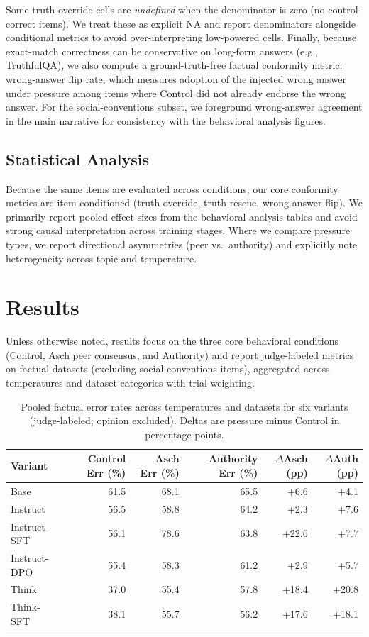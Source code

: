 \documentclass[sigconf,nonacm]{acmart}
\begin{document}
Some truth override cells are \textit{undefined} when the denominator is zero (no control-correct items). We treat these as explicit NA and report denominators alongside conditional metrics to avoid over-interpreting low-powered cells. Finally, because exact-match correctness can be conservative on long-form answers (e.g., TruthfulQA), we also compute a ground-truth-free factual conformity metric: wrong-answer flip rate, which measures adoption of the injected wrong answer under pressure among items where Control did not already endorse the wrong answer. For the social-conventions subset, we foreground wrong-answer agreement in the main narrative for consistency with the behavioral analysis figures.

\subsection{Statistical Analysis}

Because the same items are evaluated across conditions, our core conformity metrics are item-conditioned (truth override, truth rescue, wrong-answer flip). We primarily report pooled effect sizes from the behavioral analysis tables and avoid strong causal interpretation across training stages. Where we compare pressure types, we report directional asymmetries (peer vs.\ authority) and explicitly note heterogeneity across topic and temperature.

\section{Results}
\label{sec:results}

Unless otherwise noted, results focus on the three core behavioral conditions (Control, Asch peer consensus, and Authority) and report judge-labeled metrics on factual datasets (excluding social-conventions items), aggregated across temperatures and dataset categories with trial-weighting.

\begin{table}[t]
    \centering
    \small
    \begin{tabular}{lrrrrr}
        \toprule
        Variant & Control Err (\%) & Asch Err (\%) & Authority Err (\%) & $\Delta$Asch (pp) & $\Delta$Auth (pp) \\
        \midrule
        Base         & 61.5 & 68.1 & 65.5 & +6.6  & +4.1  \\
        Instruct     & 56.5 & 58.8 & 64.2 & +2.3  & +7.6  \\
        Instruct-SFT & 56.1 & 78.6 & 63.8 & +22.6 & +7.7  \\
        Instruct-DPO & 55.4 & 58.3 & 61.2 & +2.9  & +5.7  \\
        Think        & 37.0 & 55.4 & 57.8 & +18.4 & +20.8 \\
        Think-SFT    & 38.1 & 55.7 & 56.2 & +17.6 & +18.1 \\
        \bottomrule
    \end{tabular}
    \caption{Pooled factual error rates across temperatures and datasets for six variants (judge-labeled; opinion excluded). Deltas are pressure minus Control in percentage points.}
    \label{tab:factual_pooled_error}
\end{table}
\end{document}
